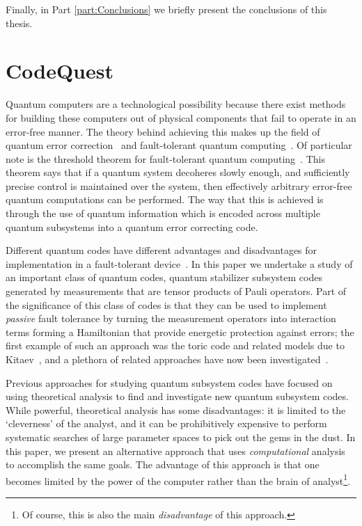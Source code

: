 \documentclass[12pt]{amsbook}
\theoremstyle{plain}
\theoremstyle{definition}
\theoremstyle{remark}
\begin{document}
Finally, in Part \ref{part:Conclusions} we briefly present the conclusions of this thesis.
\part{CodeQuest}
\label{part:CodeQuest}
Quantum computers are a technological possibility because there exist methods for building these computers out of physical components that fail to operate in an error-free manner.  The theory behind achieving this makes up the field of quantum error correction~\cite{Shor:95a,Steane:96a,Steane:96b,Steane:96c,Knill:97a,Gottesman:97a} and fault-tolerant quantum computing~\cite{Shor:96a,Aharonov:97a,Knill:98a,Knill:98b,Preskill:98a,Aliferis:05a}. Of particular note is the threshold theorem for fault-tolerant quantum computing~\cite{Aharonov:97a,Knill:98a,Knill:98b,Aliferis:05a}.  This theorem says that if a quantum system decoheres slowly enough, and sufficiently precise control is maintained over the system, then effectively arbitrary error-free quantum computations can be performed.  The way that this is achieved is through the use of quantum information which is encoded across multiple quantum subsystems into a quantum error correcting code.

Different quantum codes have different advantages and disadvantages for implementation in a fault-tolerant device~\cite{Cross:07a}.  In this paper we undertake a study of an important class of quantum codes, quantum stabilizer subsystem codes~\cite{Poulin:05a,Kribs:05a,Kribs:05b,Kribs:06a} generated by measurements that are tensor products of Pauli operators.  Part of the significance of this class of codes is that they can be used to implement \emph{passive} fault tolerance by turning the measurement operators into interaction terms forming a Hamiltonian that provide energetic protection against errors;  the first example of such an approach was the toric code and related models due to Kitaev~\cite{Kitaev:97c,Kitaev:03a}, and a plethora of related approaches have now been investigated~\cite{Barnes:00a,Bacon:01b,Jordan:05a,Weinstein:05b,Bacon:06a,Bacon:08b,Nayak:08a,Bombin:09a,Chesi:10a}.

Previous approaches for studying quantum subsystem codes have focused on using theoretical analysis to find and investigate new quantum subsystem codes.  While powerful, theoretical analysis has some disadvantages:  it is limited to the `cleverness' of the analyst, and it can be prohibitively expensive to perform systematic searches of large parameter spaces to pick out the gems in the dust.  In this paper, we present an alternative approach that uses \emph{computational} analysis to accomplish the same goals.  The advantage of this approach is that one becomes limited by the power of the computer rather than the brain of analyst\footnote{Of course, this is also the main \emph{disadvantage} of this approach.}.
\end{document}
